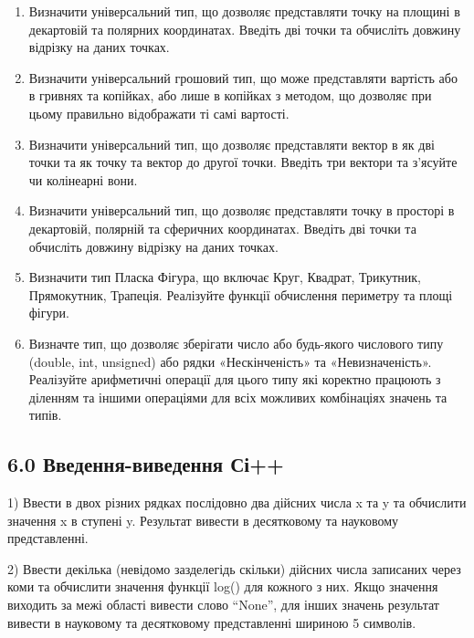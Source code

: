 \documentclass[]{article}
\begin{document}
\begin{enumerate}
\def\labelenumi{\arabic{enumi})}
\item
  Визначити універсальний тип, що дозволяє представляти точку на площині
  в декартовій та полярних координатах. Введіть дві точки та обчисліть
  довжину відрізку на даних точках.
\item
  Визначити універсальний грошовий тип, що може представляти вартість
  або в гривнях та копійках, або лише в копійках з методом, що дозволяє
  при цьому правильно відображати ті самі вартості.
\item
  Визначити універсальний тип, що дозволяє представляти вектор в як дві
  точки та як точку та вектор до другої точки. Введіть три вектори та
  з'ясуйте чи колінеарні вони.
\item
  Визначити універсальний тип, що дозволяє представляти точку в просторі
  в декартовій, полярній та сферичних координатах. Введіть дві точки та
  обчисліть довжину відрізку на даних точках.
\item
  Визначити тип Пласка Фігура, що включає Круг, Квадрат, Трикутник,
  Прямокутник, Трапеція. Реалізуйте функції обчислення периметру та
  площі фігури.
\item
  Визначте тип, що дозволяє зберігати число або будь-якого числового
  типу (double, int, unsigned) або рядки «Нескінченість» та
  «Невизначеність». Реалізуйте арифметичні операції для цього типу які
  коректно працюють з діленням та іншими операціями для всіх можливих
  комбінаціях значень та типів.
\end{enumerate}

\subsection{6.0 Введення-виведення
Сі++}\label{ux432ux432ux435ux434ux435ux43dux43dux44f-ux432ux438ux432ux435ux434ux435ux43dux43dux44f-ux441ux456}

1) \protect\hypertarget{_Hlk65238415}{}{}Ввести в двох різних рядках
послідовно два дійсних числа x та y та обчислити значення x в ступені y.
Результат вивести в десятковому та науковому представленні.

2) \protect\hypertarget{_Hlk65238515}{}{}Ввести декілька (невідомо
зазделегідь скільки) дійсних числа записаних через коми та обчислити
значення функції log() для кожного з них. Якщо значення виходить за межі
області вивести слово ``None'', для інших значень результат вивести в
науковому та десятковому представленні шириною 5 символів.
\end{document}
